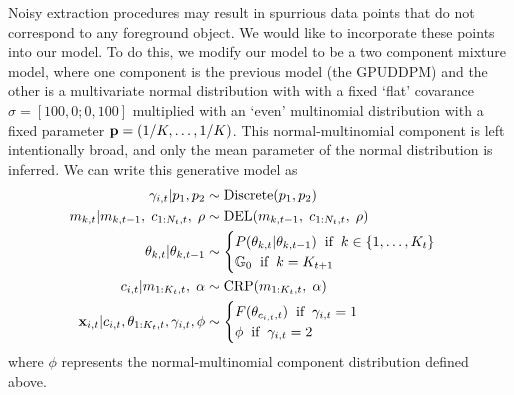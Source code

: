 \documentclass[twocolumn, final]{svjour3}
\begin{document}
Noisy extraction procedures may result in spurrious data points that do not correspond to any foreground object. We would like to incorporate these points into our model. To do this, we modify our model to be a two component mixture model, where one component is the previous model (the GPUDDPM) and the other is a multivariate normal distribution with with a fixed `flat' covarance $\sigma = [100, 0; 0, 100]$ multiplied with an `even' multinomial distribution with a fixed parameter $\bold{p} = (1/K, \ldots, 1/K)$. This normal-multinomial component is left intentionally broad, and only the mean parameter of the normal distribution is inferred. We can write this generative model as
\begin{align}
\label{background_model}
\begin{split}
\gamma_{i,t} | p_{1}, p_{2} &\sim \text{Discrete}(p_{1}, p_{2})\\
m_{k,t} | m_{k,t-1}, \hspace{1mm} c_{1:N_{t}, t}, \hspace{1mm} \rho  &\sim \text{DEL}(m_{k,t-1}, \hspace{1mm} c_{1:N_{t}, t}, \hspace{1mm} \rho) \\
\theta_{k, t} | \theta_{k, t-1}   &\sim
\begin{cases}
	P(\theta_{k, t} | \theta_{k, t-1}) \hspace{2mm} \text{if} \hspace{2mm} k \in \{ 1, \ldots, K_{t} \} \\
	\mathbb{G}_{0}   \hspace{2mm} \text{if} \hspace{2mm} k = K_{t+1}
\end{cases} \\
c_{i,t} | m_{1:K_{t},t}, \hspace{1mm} \alpha  &\sim  \text{CRP} (m_{1:K_{t},t}, \hspace{1mm} \alpha) \\
\bold{x}_{i,t} | c_{i,t}, \theta_{1:K_{t}, t}, \gamma_{i,t}, \phi &\sim
\begin{cases}
	F(\theta_{c_{i,t}, t}) \hspace{2mm} \text{if} \hspace{2mm} \gamma_{i,t} = 1 \\
	\phi \hspace{2mm} \text{if} \hspace{2mm} \gamma_{i,t} = 2
\end{cases} \\
\end{split}
\end{align}
where $\phi$ represents the normal-multinomial component distribution defined above.
\end{document}
